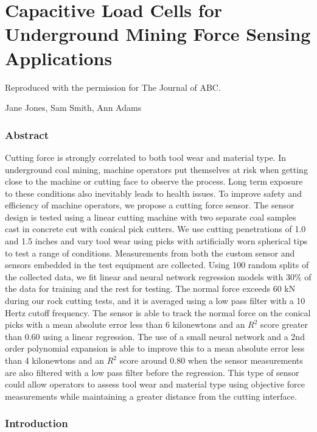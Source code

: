 \chapter{Capacitive Load Cells for Underground Mining Force Sensing Applications
\label{chap:P3}}

\begin{center}
    Reproduced with the permission for The Journal of ABC. 
    
    Jane Jones, Sam Smith, Ann Adams
\end{center}

\subsection{Abstract}

Cutting force is strongly correlated to both tool wear and material type.
In underground coal mining, machine operators put themselves at risk when 
getting close to the machine or cutting face to observe the process.
Long term exposure to these conditions also inevitably leads to health issues.
To improve safety and efficiency of machine operators, 
we propose a cutting force sensor.
The sensor design is tested using a linear cutting machine with two separate coal samples
cast in concrete cut with conical pick cutters. 
We use cutting penetrations of 1.0 and 1.5 inches and vary tool wear using picks with artificially worn
spherical tips to test a range of conditions.
Measurements from both the custom sensor and sensors embedded in the test equipment are collected.
Using 100 random splits of the collected data, we fit linear and neural network regression models
with 30\% of the data for training and the rest for testing. 
The normal force exceeds 60 kN during our rock cutting tests,
and it is averaged using a low pass filter with a 10 Hertz cutoff frequency.
The sensor is able to track the normal force on the conical picks with a 
mean absolute error less than 6 kilonewtons and an $R^2$ score greater than 0.60 using a linear regression.
The use of a small neural network and a 2nd order polynomial expansion is able to 
improve this to a mean absolute error less than 4 kilonewtons and an $R^2$ score around 0.80 when the 
sensor measurements are also filtered with a low pass filter before the regression.
This type of sensor could allow operators to assess tool wear and material type
using objective force measurements while maintaining a greater distance from the cutting interface.

\subsection{Introduction}\label{sec1}

